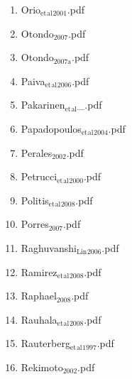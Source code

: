 \documentclass[11pt]{article}
\begin{document}
\begin{enumerate}
\begin{enumerate}
\item Orio$_{\text{et}}$$_{\text{al}}$$_{\text{2001}}$.pdf
\label{sec-1-1-1-1-11-19-17-114}

\item Otondo$_{\text{2007}}$.pdf
\label{sec-1-1-1-1-11-19-17-115}

\item Otondo$_{\text{2007a}}$.pdf
\label{sec-1-1-1-1-11-19-17-116}

\item Paiva$_{\text{et}}$$_{\text{al}}$$_{\text{2006}}$.pdf
\label{sec-1-1-1-1-11-19-17-117}

\item Pakarinen$_{\text{et}}$$_{\text{al}}$\_.pdf
\label{sec-1-1-1-1-11-19-17-118}

\item Papadopoulos$_{\text{et}}$$_{\text{al}}$$_{\text{2004}}$.pdf
\label{sec-1-1-1-1-11-19-17-119}

\item Perales$_{\text{2002}}$.pdf
\label{sec-1-1-1-1-11-19-17-120}

\item Petrucci$_{\text{et}}$$_{\text{al}}$$_{\text{2000}}$.pdf
\label{sec-1-1-1-1-11-19-17-121}

\item Politis$_{\text{et}}$$_{\text{al}}$$_{\text{2008}}$.pdf
\label{sec-1-1-1-1-11-19-17-122}

\item Porres$_{\text{2007}}$.pdf
\label{sec-1-1-1-1-11-19-17-123}

\item Raghuvanshi$_{\text{Lin}}$$_{\text{2006}}$.pdf
\label{sec-1-1-1-1-11-19-17-124}

\item Ramirez$_{\text{et}}$$_{\text{al}}$$_{\text{2008}}$.pdf
\label{sec-1-1-1-1-11-19-17-125}

\item Raphael$_{\text{2008}}$.pdf
\label{sec-1-1-1-1-11-19-17-126}

\item Rauhala$_{\text{et}}$$_{\text{al}}$$_{\text{2008}}$.pdf
\label{sec-1-1-1-1-11-19-17-127}

\item Rauterberg$_{\text{et}}$$_{\text{al}}$$_{\text{1997}}$.pdf
\label{sec-1-1-1-1-11-19-17-128}

\item Rekimoto$_{\text{2002}}$.pdf
\label{sec-1-1-1-1-11-19-17-129}


\end{enumerate}
\end{enumerate}
\end{document}
